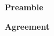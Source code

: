
\begin{center}
{\Large\bf Preamble}
\end{center}

 




\pagebreak
\begin{center}
{\Large\bf Agreement}
\end{center}

